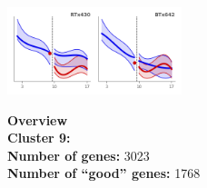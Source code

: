 \begin{multicols}{2}
\includegraphics[width=2in]{figures/clusters/leaf_Postflowering_8.png}
\columnbreak

\noindent \textbf{Overview}\\\textbf{Cluster 9:}  \\
\textbf{Number of genes:} 3023 \\
\textbf{Number of ``good'' genes:} 1768 \\
\end{multicols}

